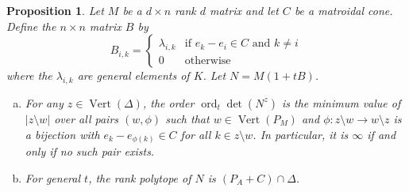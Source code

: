 \documentclass[12pt]{amsart}
\newcommand{\Vt}{{\operatorname{Vert}}}
\newcommand{\ord}{{\operatorname{ord}}}
\theoremstyle{plain}
\newtheorem{Prop}[Thm]{Proposition}
\theoremstyle{definition}
\theoremstyle{remark}
\begin{document}
\begin{Prop}\label{addcone}
Let $M$ be a  $d \times n$ rank $d$ matrix and let $C$ be a matroidal cone. Define the $n \times n$ matrix $B$ by
\[
B_{i,k}= \begin{cases}
\lambda_{i,k} & \mbox{if $e_k-e_i \in C$ and $k \ne i$}\\
0 & \mbox{otherwise}
\end{cases}
\]
where the $\lambda_{i,k}$ are general elements of $K$. Let $N = M(1+tB)$.
\begin{enumerate}[(a)]
\item For any $z \in \Vt(\Delta)$, the order $\ord_t \det(N^z)$ is the minimum value of $|z \setminus w|$ over all pairs $(w, \phi)$ such that $w \in \Vt(P_M)$ and $\phi: z \setminus w \to w \setminus z$ is a bijection with $e_k-e_{\phi(k)} \in C$ for all $k \in z \setminus w$. In particular, it is $\infty$ if and only if no such pair exists.
\item For general $t$, the rank polytope of $N$ is $(P_A+C)\cap \Delta$.
\end{enumerate}
\end{Prop}
\end{document}
